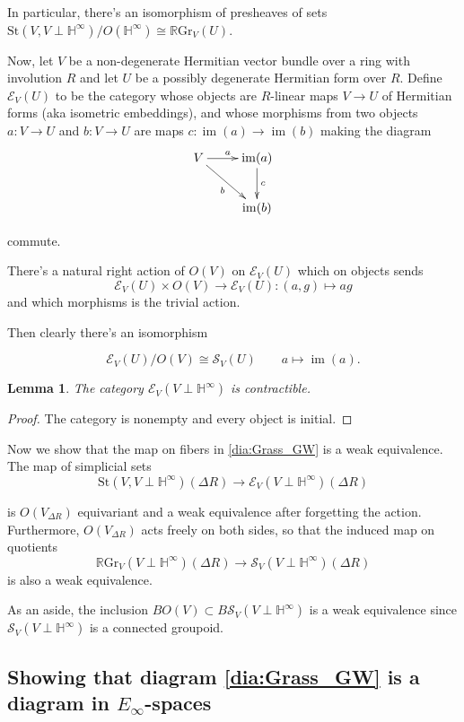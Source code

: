 \documentclass[edeposit,fullpage]{uiucthesis2009}
\newcommand{\mbb}{\mathbb}
\newcommand{\mc}{\mathcal}
\newcommand{\RGr}{\mathbb R\mathrm{Gr}}
\newcommand{\St}{\mathrm{St}}
\DeclareMathOperator*{\im}{im}
\theoremstyle{plain}
\newtheorem{lemma}{Lemma}
\numberwithin{lemma}{section}
\theoremstyle{definition}
\begin{document}
In particular, there's an isomorphism of presheaves of sets $\St(V,V \perp \mbb
H^\infty)/O(\mbb H^\infty) \cong \RGr_V(U)$.

Now, let $V$ be a non-degenerate Hermitian vector bundle over a ring with
involution $R$ and let $U$ be a possibly degenerate Hermitian form
over $R$. Define $\mc E_V(U)$ to be the category whose objects are
$R$-linear maps $V \rightarrow U$ of Hermitian forms (aka isometric embeddings), and whose
morphisms from two objects $a : V \rightarrow U$ and $b : V
\rightarrow U$ are maps $c : \im(a) \rightarrow \im(b)$ making the
diagram
\[
\xymatrix{V \ar[r]^a\ar[dr]_b & \im(a) \ar[d]^c\\ & \im(b)}
\]

commute.

There's a natural right action of $O(V)$ on $\mc E_V(U)$ which on
objects sends
\[
\mc E_V(U) \times O(V) \rightarrow \mc E_V(U) : (a,g) \mapsto ag
\]
and which morphisms is the trivial action.

Then clearly there's an isomorphism

\[
\mc E_V(U)/O(V) \cong \mc S_V(U) \qquad a \mapsto \im(a).
\] 

\begin{lemma}
The category $\mc E_V(V \perp \mbb H^\infty)$ is contractible.
\end{lemma}

\begin{proof}
The category is nonempty and every object is initial.
\end{proof}

Now we show that the map on fibers in \ref{dia:Grass_GW} is a weak
equivalence. The map of simplicial sets
\[
\St(V,V\perp \mbb H^\infty)(\Delta R) \rightarrow \mc E_V(V \perp \mbb
H^\infty)(\Delta R)
\]

is $O(V_{\Delta R})$ equivariant and a weak equivalence after
forgetting the action. Furthermore, $O(V_{\Delta R})$ acts freely on
both sides, so that the induced map on quotients 
\begin{equation}\label{eq:RGr_Sv}
\RGr_V(V \perp \mbb
H^\infty)({\Delta R}) \rightarrow \mc S_V(V \perp \mbb
H^\infty)(\Delta R)
\end{equation}
 is also a weak equivalence. 

As an aside, the inclusion $BO(V) \subset B\mc S_V(V \perp \mbb
H^\infty)$ is a weak equivalence since $\mc S_V(V \perp \mbb
H^\infty)$ is a connected groupoid. 

\subsection{Showing that diagram \ref{dia:Grass_GW} is a diagram in
  $E_\infty$-spaces}
\end{document}
